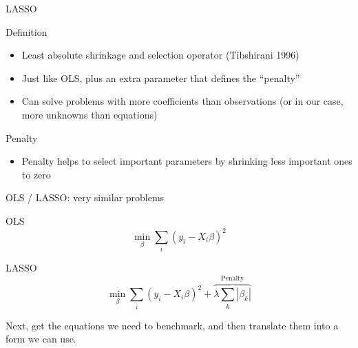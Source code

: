 \documentclass[12pt]{beamer}
\begin{document}
\begin{frame}{LASSO}

\begin{block}{Definition}
\begin{itemize}
\item Least absolute shrinkage and selection operator (Tibshirani 1996)
\item Just like OLS, plus an extra parameter that defines the ``penalty''
\item Can solve problems with more coefficients than observations (or in our case, more unknowns than equations)
\end{itemize}
\end{block}

\begin{block}{Penalty}
\begin{itemize}
\item Penalty helps to select important parameters by shrinking less important ones to zero
\end{itemize}
\end{block}


\end{frame}

\begin{frame}{OLS / LASSO: very similar problems}

\begin{block}{OLS}
\begin{equation}
\min_{\beta}  \sum_i \left( y_i - X_i \beta \right)^2
\end{equation}
\end{block}

\begin{block}{LASSO}
\begin{equation}
\min_{\beta}  \sum_i \left(y_i - X_i \beta \right)^2 + \overbrace{\lambda \sum_k | \beta_k |}^{\text{Penalty}}
\end{equation}
\end{block}

Next, get the equations we need to benchmark, and then translate them into a form we can use.

\end{frame}
\end{document}
